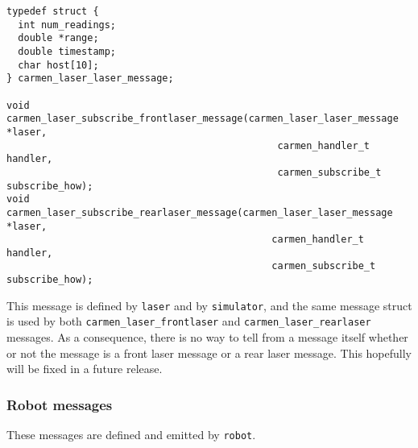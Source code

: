 \documentclass{article}
\begin{document}
\begin{verbatim}
typedef struct {
  int num_readings;
  double *range;
  double timestamp;
  char host[10];
} carmen_laser_laser_message;

void carmen_laser_subscribe_frontlaser_message(carmen_laser_laser_message *laser,
                                               carmen_handler_t handler,
                                               carmen_subscribe_t subscribe_how);
void carmen_laser_subscribe_rearlaser_message(carmen_laser_laser_message *laser,
                                              carmen_handler_t handler,
                                              carmen_subscribe_t subscribe_how);
\end{verbatim}

This message is defined by \verb!laser! and by \verb!simulator!, and the same
message struct is used by both \verb!carmen_laser_frontlaser! and
\verb!carmen_laser_rearlaser! messages. As a consequence, there is no way to
tell from a message itself whether or not the message is a front laser message
or a rear laser message. This hopefully will be fixed in a future release.

\subsubsection{Robot messages}

These messages are defined and emitted by \verb!robot!.
\end{document}
